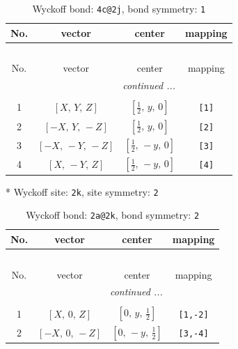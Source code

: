 \documentclass[fleqn,8pt]{jsarticle}
\begin{document}
\begin{longtable}{cccc}
\caption{Wyckoff bond: {\tt 4c@2j}, bond symmetry: {\tt 1}}
 \\
 \hline \hline
No. & vector & center & mapping \\ \hline \endfirsthead

\multicolumn{3}{l}{\tablename\ \thetable{}} \\
 \hline \hline
No. & vector & center & mapping \\ \hline \endhead

 \hline \hline
\multicolumn{3}{r}{\footnotesize\it continued ...} \\ \endfoot

 \hline \hline
\multicolumn{3}{r}{} \\ \endlastfoot

1 & $\left[ X,\, Y,\, Z \right]$ & $\left[ \frac{1}{2},\, y,\, 0 \right]$ & {\tt [1]} \\ \hline
2 & $\left[ - X,\, Y,\, - Z \right]$ & $\left[ \frac{1}{2},\, y,\, 0 \right]$ & {\tt [2]} \\ \hline
3 & $\left[ - X,\, - Y,\, - Z \right]$ & $\left[ \frac{1}{2},\, - y,\, 0 \right]$ & {\tt [3]} \\ \hline
4 & $\left[ X,\, - Y,\, Z \right]$ & $\left[ \frac{1}{2},\, - y,\, 0 \right]$ & {\tt [4]} \\
\end{longtable}
* Wyckoff site: {\tt 2k}, site symmetry: {\tt 2}
\renewcommand{\arraystretch}{1.2}
\begin{longtable}{cccc}
\caption{Wyckoff bond: {\tt 2a@2k}, bond symmetry: {\tt 2}}
 \\
 \hline \hline
No. & vector & center & mapping \\ \hline \endfirsthead

\multicolumn{3}{l}{\tablename\ \thetable{}} \\
 \hline \hline
No. & vector & center & mapping \\ \hline \endhead

 \hline \hline
\multicolumn{3}{r}{\footnotesize\it continued ...} \\ \endfoot

 \hline \hline
\multicolumn{3}{r}{} \\ \endlastfoot

1 & $\left[ X,\, 0,\, Z \right]$ & $\left[ 0,\, y,\, \frac{1}{2} \right]$ & {\tt [1,-2]} \\ \hline
2 & $\left[ - X,\, 0,\, - Z \right]$ & $\left[ 0,\, - y,\, \frac{1}{2} \right]$ & {\tt [3,-4]} \\
\end{longtable}
\end{document}
